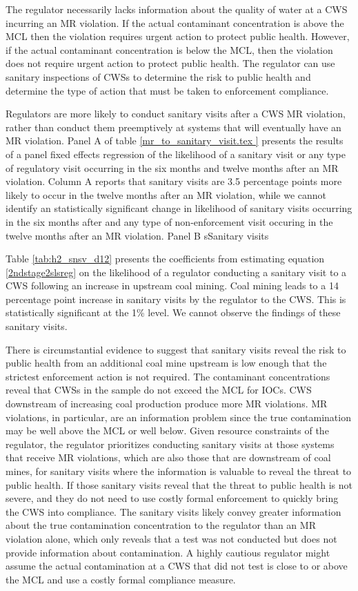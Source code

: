 \documentclass{article}
\begin{document}
The regulator necessarily lacks information about the quality of water at a CWS incurring an MR violation. If the actual contaminant concentration is above the MCL then the violation requires urgent action to protect public health. However, if the actual contaminant concentration is below the MCL, then the violation does not require urgent action to protect public health. The regulator can use sanitary inspections of CWSs to determine the risk to public health and determine the type of action that must be taken to enforcement compliance. 

Regulators are more likely to conduct sanitary visits after a CWS MR violation, rather than conduct them preemptively at systems that will eventually have an MR violation. Panel A of table \ref{mr_to_sanitary_visit.tex
} presents the results of a panel fixed effects regression of the likelihood of a sanitary visit or any type of regulatory visit occurring in the six months and twelve months after an MR violation. Column A reports that sanitary visits are 3.5 percentage points more likely to occur in the twelve months after an MR violation, while we cannot identify an statistically significant change in likelihood of sanitary visits occurring in the six months after and any type of non-enforcement visit occuring in the twelve months after an MR violation. Panel B sSanitary visits

Table \ref{tab:h2_snsv_d12} presents the coefficients from estimating equation \ref{2ndstage2slsreg} on the likelihood of a regulator conducting a sanitary visit to a CWS following an increase in upstream coal mining. Coal mining leads to a 14 percentage point increase in sanitary visits by the regulator to the CWS. This is statistically significant at the 1\% level. We cannot observe the findings of these sanitary visits. 

There is circumstantial evidence to suggest that sanitary visits reveal the risk to public health from an additional coal mine upstream is low enough that the strictest enforcement action is not required. The contaminant concentrations reveal that CWSs in the sample do not exceed the MCL for IOCs. CWS downstream of increasing coal production produce more MR violations. MR violations, in particular, are an information problem since the true contamination may be well above the MCL or well below. Given resource constraints of the regulator, the regulator prioritizes conducting sanitary visits at those systems that receive MR violations, which are also those that are downstream of coal mines, for sanitary visits where the information is valuable to reveal the threat to public health. If those sanitary visits reveal that the threat to public health is not severe, and they do not need to use costly formal enforcement to quickly bring the CWS into compliance. The sanitary visits likely convey greater information about the true contamination concentration to the regulator than an MR violation alone, which only reveals that a test was not conducted but does not provide information about contamination. A highly cautious regulator might assume the actual contamination at a CWS that did not test is close to or above the MCL and use a costly formal compliance measure.
\end{document}
